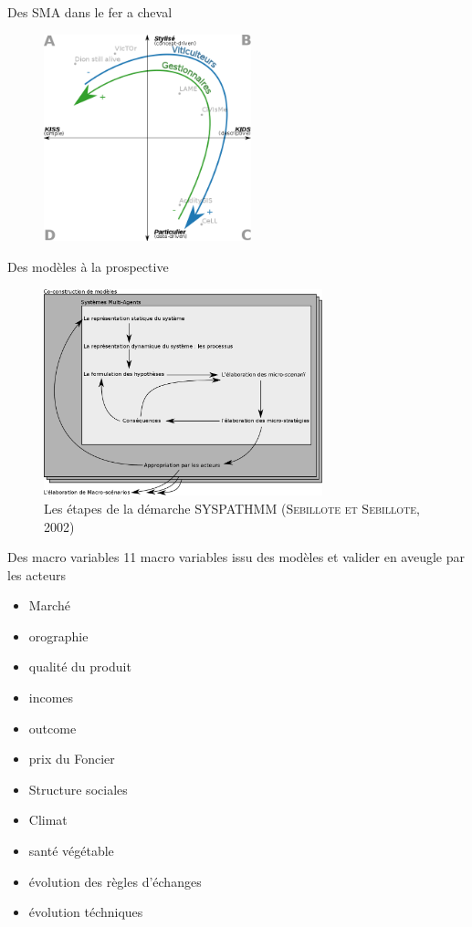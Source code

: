 \documentclass[newPxFont]{beamer}
\begin{document}
\begin{frame}[c]{Des SMA dans le fer a cheval}
  \vspace{-2em}
  \begin{figure}
   \includegraphics[height=6cm]{img/a_banos_sanders_positionnements.png}
  \end{figure}
\end{frame}

\begin{frame}[c]{Des modèles à la prospective}
  \vspace{-2em}
  \begin{figure}
   \includegraphics[height=6cm]{img/a_etapes_syspathmm.png}
   \caption{Les étapes de la démarche SYSPATHMM (\textsc{Sebillote et Sebillote,  2002})}
  \end{figure}
\end{frame}

\begin{frame}[c]{Des macro variables}
  \vspace{-2em}
  11 macro variables issu des modèles et valider en aveugle par les acteurs
  \begin{itemize}
    \item Marché
    \item orographie
    \item qualité du produit
    \item incomes
    \item outcome
    \item prix du Foncier
    \item Structure sociales
    \item Climat
    \item santé végétable
    \item évolution des règles d'échanges
    \item évolution téchniques
  \end{itemize}
\end{frame}
\end{document}

